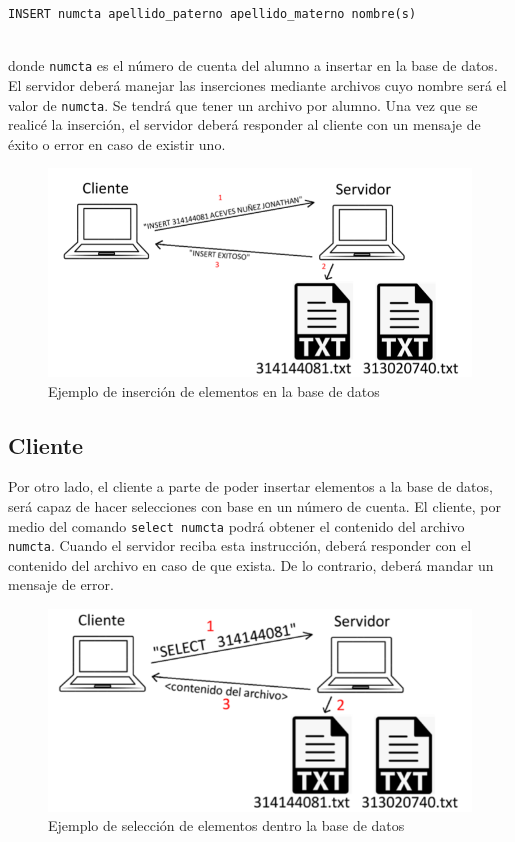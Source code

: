 \documentclass{article}
\begin{document}
\verb|INSERT numcta apellido_paterno apellido_materno nombre(s)| \\ 

donde \verb|numcta| es el número de cuenta del alumno a insertar en la base de datos. El servidor deberá manejar las inserciones mediante archivos cuyo nombre será el valor de \verb|numcta|. Se tendrá que tener un archivo por alumno. Una vez que se realicé la inserción, el servidor deberá responder al cliente con un mensaje de éxito o error en caso de existir uno. 


\begin{figure}[H]
    \centering
    \includegraphics[scale=0.3]{imgs/insert_numcta.png}
    \caption{Ejemplo de inserción de elementos en la base de datos}
    \label{fig:insert_numcta}
\end{figure}

\subsection{Cliente}

Por otro lado, el cliente a parte de poder insertar elementos a la base de datos, será capaz de hacer selecciones con base en un número de cuenta. El cliente, por medio del comando \verb|select numcta| podrá obtener el contenido del archivo \verb|numcta|. Cuando el servidor reciba esta instrucción, deberá responder con el contenido del archivo en caso de que exista. De lo contrario, deberá mandar un mensaje de error. 

\begin{figure}[H]
    \centering
    \includegraphics[scale=0.32]{imgs/select_numcta.png}
    \caption{Ejemplo de selección de elementos dentro la base de datos}
    \label{fig:select_numcta}
\end{figure}
\end{document}
